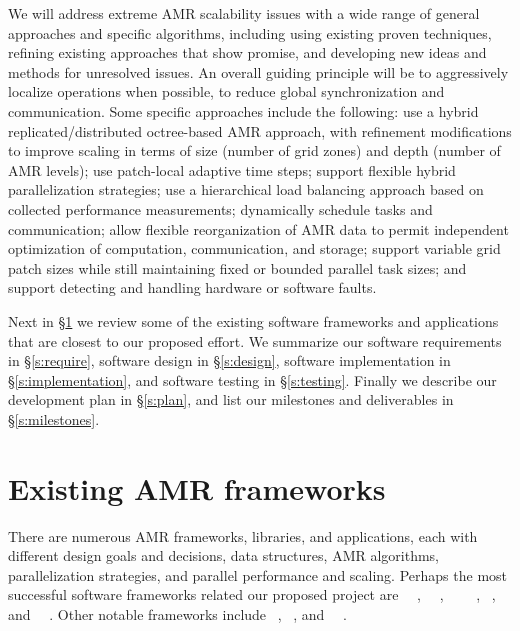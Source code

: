 \documentclass[10pt,twocolumn]{article}
\begin{document}
We will address extreme AMR scalability issues with a wide range of
general approaches and specific algorithms, including using existing
proven techniques, refining existing approaches that show promise, and
developing new ideas and methods for unresolved issues.
%
An overall guiding principle will be to aggressively localize
operations when possible, to reduce global synchronization and
communication.
%
Some specific approaches include the following: 
%
use a hybrid replicated/distributed octree-based AMR approach, with
refinement modifications to improve scaling in terms of size (number
of grid zones) and depth (number of AMR levels);
%
use patch-local adaptive time steps;
%
support flexible hybrid parallelization strategies;
%
use a hierarchical load balancing approach based on collected performance measurements; 
%
dynamically schedule tasks and communication;
%
allow flexible reorganization of AMR data to permit independent
optimization of computation, communication, and storage;
%
support variable grid patch sizes while still maintaining fixed or
bounded parallel task sizes;
%
and support detecting and handling hardware or software faults.

Next in \S\ref{s:review} we review some of the existing software
frameworks and applications that are closest to our proposed effort.
We summarize our software requirements in \S\ref{s:require}, software design in
\S\ref{s:design}, software implementation in \S\ref{s:implementation}, and
software testing in \S\ref{s:testing}.  Finally we describe our development
plan in \S\ref{s:plan}, and list our milestones and deliverables in
\S\ref{s:milestones}.

\section{Existing AMR frameworks} \label{s:review}

There are numerous AMR frameworks, libraries, and applications, each
with different design goals and decisions, data structures, AMR
algorithms, parallelization strategies, and parallel performance and
scaling.  Perhaps the most successful software frameworks related our
proposed project are
\chombo~\cite{wwwchombo}~\cite{CoGr09},
\samrai~\cite{WiHo01}~\cite{wwwsamraicode}, 
\paramesh~\cite{MaOl00}~\cite{OlMa05}~\cite{Ol06}~\cite{wwwparamesh},
\alps~\cite{BuBu09}, and
\gadget~\cite{wwwgadget}~\cite{Sp05}.  Other notable frameworks
include \clawpack~\cite{wwwclawpack}, \grace~\cite{PaLi10}, and
\carpet~\cite{ScDi06}~\cite{wwwcarpet}.
\end{document}
